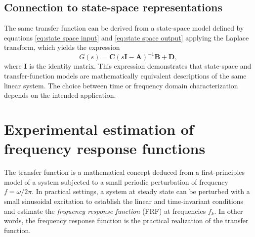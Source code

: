 
\subsection{Connection to state-space representations}

The same transfer function can be derived from a state-space model defined by equations \ref{eq:state space input} and \ref{eq:state space output} applying the Laplace transform, which yields the expression 
\begin{equation}
G(s) = \textbf{C} (s\textbf{I} - \textbf{A})^{-1} \textbf{B} + \textbf{D},
\end{equation}
where $\textbf{I}$ is the identity matrix.
This expression demonstrates that state-space and transfer-function models are mathematically equivalent descriptions of the same linear system.
The choice between time or frequency domain characterization depends on the intended application.




\section{Experimental estimation of frequency response functions}

The transfer function is a mathematical concept deduced from a first-principles model of a system subjected to a small periodic perturbation of frequency \( f = \omega/2 \pi \).
In practical settings, a system at steady state can be perturbed with a small sinusoidal excitation to establish the linear and time-invariant conditions and estimate the \emph{frequency response function} (FRF) at frequencies \( f_k \).
In other words, the frequency response function is the practical realization of the transfer function.

